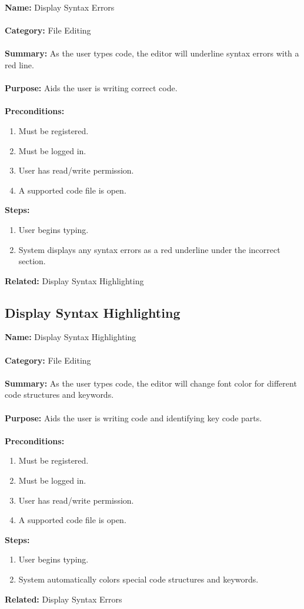 \documentclass[14pt, a4paper]{article}
\begin{document}
\begin{framed}
	\noindent\textbf{Name:} Display Syntax Errors \\ \\
	\textbf{Category:} File Editing \\ \\
	\textbf{Summary:} As the user types code, the editor will underline syntax errors with a red line. \\ \\
	\textbf{Purpose:} Aids the user is writing correct code. \\ \\
	\textbf{Preconditions:} 
	\begin{enumerate}
		\item Must be registered.
		\item Must be logged in.
		\item User has read/write permission.
		\item A supported code file is open.
	\end{enumerate}
	\textbf{Steps:}
	\begin{enumerate}
		\item User begins typing.
		\item System displays any syntax errors as a red underline under the incorrect section.
	\end{enumerate}
	\textbf{Related:} Display Syntax Highlighting
\end{framed}

\newpage

\subsection{Display Syntax Highlighting}

\begin{framed}
	\noindent\textbf{Name:} Display Syntax Highlighting \\ \\
	\textbf{Category:} File Editing \\ \\
	\textbf{Summary:} As the user types code, the editor will change font color for different code structures and keywords. \\ \\
	\textbf{Purpose:} Aids the user is writing code and identifying key code parts. \\ \\
	\textbf{Preconditions:} 
	\begin{enumerate}
		\item Must be registered.
		\item Must be logged in.
		\item User has read/write permission.
		\item A supported code file is open.
	\end{enumerate}
	\textbf{Steps:}
	\begin{enumerate}
		\item User begins typing.
		\item System automatically colors special code structures and keywords.
	\end{enumerate}
	\textbf{Related:} Display Syntax Errors
\end{framed}
\end{document}
